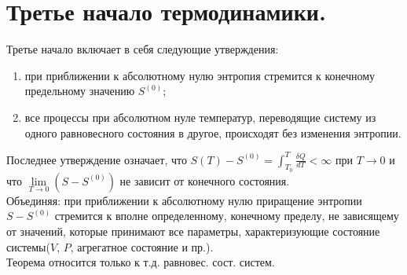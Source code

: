 \section{\normalsize Третье начало термодинамики.} Третье начало включает в себя следующие утверждения: 
\begin{enumerate}
	\item при приближении к абсолютному нулю энтропия стремится к конечному предельному значению $S^{(0)}$;
	\item все процессы при абсолютном нуле температур, переводящие систему из одного равновесного состояния в другое, происходят без изменения энтропии.
\end{enumerate}
Последнее утверждение означает, что $S(T)-S^{(0)}=\int_{T_0}^{T}\frac{\delta Q}{dT}<\infty$
при $T\rightarrow0$ и что $\lim\limits_{T\rightarrow0}(S-S^{(0)})$ не зависит от конечного состояния.\\
Объединяя: при приближении к абсолютному нулю приращение энтропии $S-S^{(0)}$ стремится к вполне определенному, конечному пределу, не зависящему от значений, которые принимают все параметры, характеризующие состояние системы($V$, $P$, агрегатное состояние и пр.).\\
Теорема относится только к т.д. равновес. сост. систем.